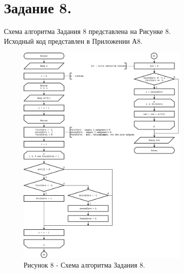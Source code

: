 \documentclass[oneside,a4paper,14pt]{extarticle}
\begin{document}
\section*{Задание 8.}
\noindent Схема алгоритма Задания 8 представлена на Рисунке 8.\\
\noindent Исходный код представлен в Приложении А8. \\
\begin{figure}[!ht]
	\centering
	\includegraphics[width=0.75\textwidth]{pics/flowchart-20.png}
	\caption*{Рисунок 8 - Схема алгоритма Задания 8.}
\end{figure}
\end{document}
